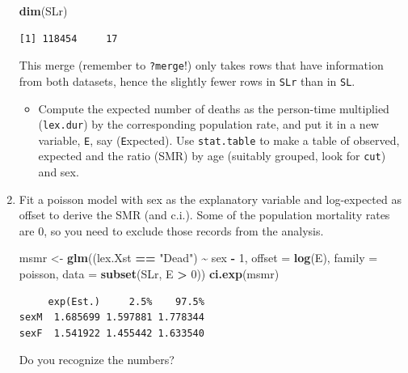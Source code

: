 \documentclass[
]{book}
\newenvironment{Shaded}{\begin{snugshade}}{\end{snugshade}}
\newcommand{\AttributeTok}[1]{\textcolor[rgb]{0.13,0.29,0.53}{#1}}
\newcommand{\DecValTok}[1]{\textcolor[rgb]{0.00,0.00,0.81}{#1}}
\newcommand{\FunctionTok}[1]{\textcolor[rgb]{0.13,0.29,0.53}{\textbf{#1}}}
\newcommand{\NormalTok}[1]{#1}
\newcommand{\OtherTok}[1]{\textcolor[rgb]{0.56,0.35,0.01}{#1}}
\newcommand{\SpecialCharTok}[1]{\textcolor[rgb]{0.81,0.36,0.00}{\textbf{#1}}}
\newcommand{\StringTok}[1]{\textcolor[rgb]{0.31,0.60,0.02}{#1}}
\providecommand{\tightlist}{%
  \setlength{\itemsep}{0pt}\setlength{\parskip}{0pt}}
\begin{document}
\begin{enumerate}
\begin{Shaded}
\begin{Highlighting}[]
\FunctionTok{dim}\NormalTok{(SLr)}
\end{Highlighting}
\end{Shaded}

\begin{verbatim}
[1] 118454     17
\end{verbatim}

  This merge (remember to \texttt{?merge}!) only takes rows that have
  information from both datasets, hence the slightly fewer rows in
  \texttt{SLr} than in \texttt{SL}.

  \begin{itemize}
  \tightlist
  \item
    Compute the expected number of deaths as the person-time
    multiplied (\texttt{lex.dur}) by the corresponding population rate, and put it in a
    new variable, \texttt{E}, say (\texttt{E}xpected). Use \texttt{stat.table}
    to make a table of observed, expected and the ratio (SMR) by age
    (suitably grouped, look for \texttt{cut}) and sex.
  \end{itemize}
\item
  Fit a poisson model with sex as the explanatory variable and
  log-expected as offset to derive the SMR (and c.i.).
  Some of the population mortality rates are 0, so you need to exclude
  those records from the analysis.

\begin{Shaded}
\begin{Highlighting}[]
\NormalTok{msmr }\OtherTok{\textless{}{-}} \FunctionTok{glm}\NormalTok{((lex.Xst }\SpecialCharTok{==} \StringTok{"Dead"}\NormalTok{) }\SpecialCharTok{\textasciitilde{}}\NormalTok{ sex }\SpecialCharTok{{-}} \DecValTok{1}\NormalTok{,}
            \AttributeTok{offset =} \FunctionTok{log}\NormalTok{(E),}
            \AttributeTok{family =}\NormalTok{ poisson,}
              \AttributeTok{data =} \FunctionTok{subset}\NormalTok{(SLr, E }\SpecialCharTok{\textgreater{}} \DecValTok{0}\NormalTok{))}
\FunctionTok{ci.exp}\NormalTok{(msmr)}
\end{Highlighting}
\end{Shaded}

\begin{verbatim}
     exp(Est.)     2.5%    97.5%
sexM  1.685699 1.597881 1.778344
sexF  1.541922 1.455442 1.633540
\end{verbatim}

  Do you recognize the numbers?


\end{enumerate}
\end{document}
